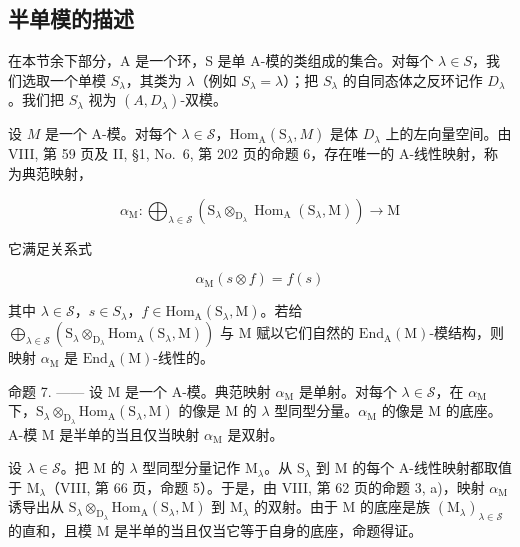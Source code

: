 \subsection{半单模的描述}

在本节余下部分，A 是一个环，S 是单 A-模的类组成的集合。对每个 \(\lambda \in S\)，我们选取一个单模 \(S_{\lambda}\)，其类为 \(\lambda\)（例如 \(S_{\lambda} = \lambda\)）；把 \(S_{\lambda}\) 的自同态体之反环记作 \(D_{\lambda}\)。我们把 \(S_{\lambda}\) 视为 \((A, D_{\lambda})\)-双模。

设 \(M\) 是一个 A-模。对每个 \(\lambda \in \mathcal{S}\)，\(\mathrm{Hom}_{\mathrm{A}}(\mathrm{S}_{\lambda}, M)\) 是体 \(D_{\lambda}\) 上的左向量空间。由 VIII, 第 59 页及 II, §1, No.~6, 第 202 页的命题 6，存在唯一的 A-线性映射，称为典范映射，

\[
\alpha_ {\mathrm{M}}: \bigoplus_ {\lambda \in \mathcal {S}} \left(\mathrm{S} _ {\lambda} \otimes_ {\mathrm{D} _ {\lambda}} \operatorname{Hom} _ {\mathrm{A}} (\mathrm{S} _ {\lambda}, \mathrm{M})\right) \to \mathrm{M}
\]

它满足关系式

\[
\alpha_ {\mathrm{M}} (s \otimes f) = f (s)\tag{10}
\]

其中 \(\lambda \in \mathcal{S}\)，\(s \in S_{\lambda}\)，\(f \in \mathrm{Hom}_{\mathrm{A}}(\mathrm{S}_{\lambda}, \mathrm{M})\)。若给 \(\bigoplus_{\lambda \in \mathcal{S}} (\mathrm{S}_{\lambda} \otimes_{\mathrm{D}_{\lambda}} \mathrm{Hom}_{\mathrm{A}}(\mathrm{S}_{\lambda}, \mathrm{M}))\) 与 \(\mathrm{M}\) 赋以它们自然的 \(\mathrm{End}_{\mathrm{A}}(\mathrm{M})\)-模结构，则映射 \(\alpha_{\mathrm{M}}\) 是 \(\mathrm{End}_{\mathrm{A}}(\mathrm{M})\)-线性的。

命题 7. —— 设 M 是一个 A-模。典范映射 \(\alpha_{\mathrm{M}}\) 是单射。对每个 \(\lambda \in \mathcal{S}\)，在 \(\alpha_{\mathrm{M}}\) 下，\(\mathrm{S}_{\lambda} \otimes_{\mathrm{D}_{\lambda}} \mathrm{Hom}_{\mathrm{A}}(\mathrm{S}_{\lambda}, \mathrm{M})\) 的像是 M 的 \(\lambda\) 型同型分量。\(\alpha_{\mathrm{M}}\) 的像是 M 的底座。A-模 M 是半单的当且仅当映射 \(\alpha_{\mathrm{M}}\) 是双射。

设 \(\lambda \in \mathcal{S}\)。把 M 的 \(\lambda\) 型同型分量记作 \(\mathrm{M}_{\lambda}\)。从 \(\mathrm{S}_{\lambda}\) 到 M 的每个 A-线性映射都取值于 \(\mathrm{M}_{\lambda}\)（VIII, 第 66 页，命题 5）。于是，由 VIII, 第 62 页的命题 3, a)，映射 \(\alpha_{\mathrm{M}}\) 诱导出从 \(\mathrm{S}_{\lambda} \otimes_{\mathrm{D}_{\lambda}} \mathrm{Hom}_{\mathrm{A}}(\mathrm{S}_{\lambda}, \mathrm{M})\) 到 \(\mathrm{M}_{\lambda}\) 的双射。由于 M 的底座是族 \((\mathrm{M}_{\lambda})_{\lambda \in \mathcal{S}}\) 的直和，且模 M 是半单的当且仅当它等于自身的底座，命题得证。

